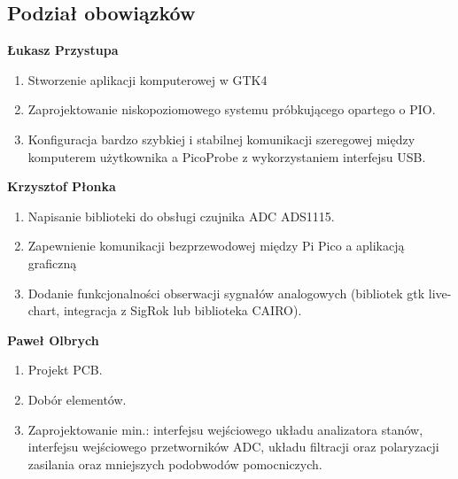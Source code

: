 \subsection{Podział obowiązków}
    \textbf{Łukasz Przystupa}
    \begin{enumerate}
        \item Stworzenie aplikacji komputerowej w GTK4
        \item Zaprojektowanie niskopoziomowego systemu próbkującego opartego o PIO.
        \item Konfiguracja bardzo szybkiej i stabilnej komunikacji szeregowej między
        komputerem użytkownika a PicoProbe z wykorzystaniem interfejsu USB.
    \end{enumerate}

    \textbf{Krzysztof Płonka}
    \begin{enumerate}
        \item Napisanie biblioteki do obsługi czujnika ADC ADS1115.
        \item Zapewnienie komunikacji bezprzewodowej między Pi Pico a aplikacją graficzną
        \item Dodanie funkcjonalności obserwacji sygnałów analogowych
        (bibliotek gtk live-chart, integracja z SigRok lub biblioteka CAIRO).
    \end{enumerate}

    \textbf{Paweł Olbrych}
    \begin{enumerate}
        \item Projekt PCB.
        \item Dobór elementów.
        \item Zaprojektowanie min.: interfejsu wejściowego układu analizatora stanów,
        interfejsu wejściowego przetworników ADC, układu filtracji oraz polaryzacji zasilania oraz
        mniejszych podobwodów pomocniczych. 
    \end{enumerate}
    